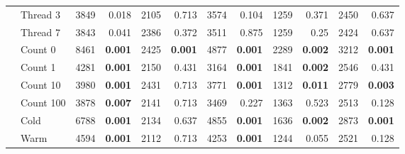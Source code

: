 \begin{table*}
{\begin{tabular}{cl|rr|rr|rr|rr|rr|}
                & Thread 3     & 3849                    & 0.018                      & 2105                      & 0.713                         & 3574                   & 0.104                     & 1259                    & 0.371                        & 2450                         & 0.637                       \\
                & Thread 7     & 3843                    & 0.041                      & 2386                      & 0.372                         & 3511                   & 0.875                     & 1259                    & 0.25                         & 2424                         & 0.637                       \\
                & Count 0      & 8461                    & \bf 0.001                  & 2425                      & \bf 0.001                     & 4877                   & \bf 0.001                 & 2289                    & \bf 0.002                    & 3212                         & \bf 0.001                   \\
                & Count 1      & 4281                    & \bf 0.001                  & 2150                      & 0.431                         & 3164                   & \bf 0.001                 & 1841                    & \bf 0.002                    & 2546                         & 0.431                       \\
                & Count 10     & 3980                    & \bf 0.001                  & 2431                      & 0.713                         & 3771                   & \bf 0.001                 & 1312                    & \bf 0.011                    & 2779                         & \bf  0.003                  \\
                & Count 100    & 3878                    & \bf 0.007                  & 2141                      & 0.713                         & 3469                   & 0.227                     & 1363                    & 0.523                        & 2513                         & 0.128                       \\
                & Cold         & 6788                    & \bf 0.001                  & 2134                      & 0.637                         & 4855                   & \bf 0.001                 & 1636                    & \bf 0.002                    & 2873                         & \bf  0.001                  \\
                & Warm         & 4594                    & \bf 0.001                  & 2112                      & 0.713                         & 4253                   & \bf 0.001                 & 1244                    & 0.055                        & 2521                         & 0.128                       \\

\end{tabular}}
\end{table*}
